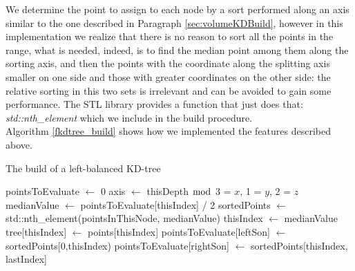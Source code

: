 We determine the point to assign to each node by a sort performed along an axis similar to the one described in Paragraph \ref{sec:volumeKDBuild}, however in this implementation we realize that there is no reason to sort all the points in the range, what is needed, indeed, is to find the median point among them along the sorting axis, and then the points with the coordinate along the splitting axis smaller on one side and those with greater coordinates on the other side: the relative sorting in this two sets is irrelevant and can be avoided to gain some performance. The STL library provides a function that just does that: \textit{std::nth\_element} which we include in the build procedure.\\
Algorithm \ref{fkdtree_build} shows how we implemented the features described above.\\

\begin{algorithm}
\caption{The build of a left-balanced KD-tree}
\label{fkdtree_build}
\begin{algorithmic}
  \State pointsToEvaluate $\gets$ 0
  \State axis $\gets$ thisDepth $\bmod$ 3  = $x$, 1 = $y$, 2 = $z$
	  	\State medianValue $\gets$ pointsToEvaluate[thisIndex] / 2
	  	\State sortedPoints $\gets$ std::nth\_element(pointsInThisNode, medianValue)
	  	\State thisIndex $\gets$ medianValue
	  	\State tree[thisIndex] $\gets$ points[thisIndex]
	  	\State pointsToEvaluate[leftSon] $\gets$ sortedPoints[0,thisIndex)
	  	\State pointsToEvaluate[rightSon] $\gets$ sortedPoints[thisIndex, lastIndex]
	  \EndFor
  \EndFor
\EndProcedure
\end{algorithmic}
\end{algorithm}

